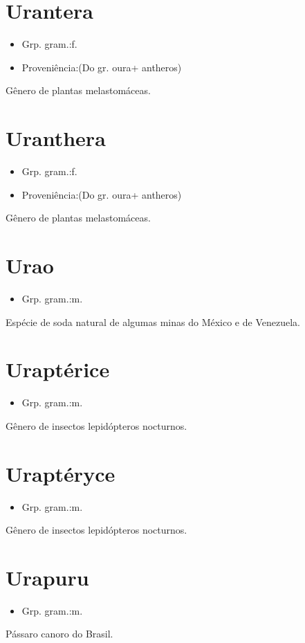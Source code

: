 \documentclass{article}
\begin{document}
\section{Urantera}
\begin{itemize}
\item {Grp. gram.:f.}
\end{itemize}
\begin{itemize}
\item {Proveniência:(Do gr. \textunderscore oura\textunderscore  + \textunderscore antheros\textunderscore )}
\end{itemize}
Gênero de plantas melastomáceas.
\section{Uranthera}
\begin{itemize}
\item {Grp. gram.:f.}
\end{itemize}
\begin{itemize}
\item {Proveniência:(Do gr. \textunderscore oura\textunderscore  + \textunderscore antheros\textunderscore )}
\end{itemize}
Gênero de plantas melastomáceas.
\section{Urao}
\begin{itemize}
\item {Grp. gram.:m.}
\end{itemize}
Espécie de soda natural de algumas minas do México e de Venezuela.
\section{Uraptérice}
\begin{itemize}
\item {Grp. gram.:m.}
\end{itemize}
Gênero de insectos lepidópteros nocturnos.
\section{Uraptéryce}
\begin{itemize}
\item {Grp. gram.:m.}
\end{itemize}
Gênero de insectos lepidópteros nocturnos.
\section{Urapuru}
\begin{itemize}
\item {Grp. gram.:m.}
\end{itemize}
Pássaro canoro do Brasil.
\end{document}
